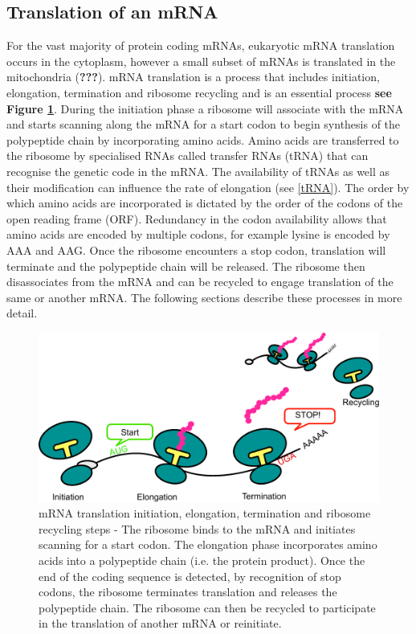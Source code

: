 \documentclass[12pt,openany]{book}
\begin{document}
\subsection{Translation of an mRNA} For the vast majority of protein
coding mRNAs, eukaryotic mRNA translation occurs in the cytoplasm,
however a small subset of mRNAs is translated in the mitochondria
({\textbf{???}}). mRNA translation is a process that includes
initiation, elongation, termination and ribosome recycling and is an
essential process \textbf{see Figure \ref{fig:doodlemRNASteps}}. During
the initiation phase a ribosome will associate with the mRNA and starts
scanning along the mRNA for a start codon to begin synthesis of the
polypeptide chain by incorporating amino acids. Amino acids are
transferred to the ribosome by specialised RNAs called transfer RNAs
(tRNA) that can recognise the genetic code in the mRNA. The availability
of tRNAs as well as their modification can influence the rate of
elongation (see \ref{tRNA}). The order by which amino acids are
incorporated is dictated by the order of the codons of the open reading
frame (ORF). Redundancy in the codon availability allows that amino
acids are encoded by multiple codons, for example lysine is encoded by
AAA and AAG. Once the ribosome encounters a stop codon, translation will
terminate and the polypeptide chain will be released. The ribosome then
disassociates from the mRNA and can be recycled to engage translation of
the same or another mRNA. The following sections describe these
processes in more detail.

\begin{figure}
  \includegraphics{./figures/doodleTranslation.pdf}
  \caption{mRNA translation initiation, elongation, termination and ribosome recycling steps - The ribosome binds to the mRNA and initiates scanning for a start codon. The elongation phase incorporates amino acids into a polypeptide chain (i.e. the protein product). Once the end of the coding sequence is detected, by recognition of stop codons, the ribosome terminates translation and releases the polypeptide chain. The ribosome can then be recycled to participate in the translation of another mRNA or reinitiate. \label{fig:doodlemRNASteps}}
\end{figure}
\end{document}
